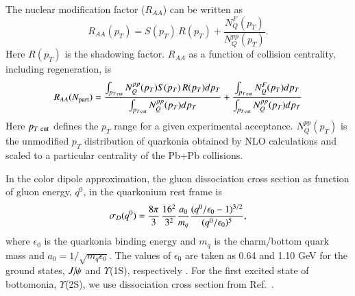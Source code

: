{\begin{equation}
  \end{equation}
  The nuclear modification factor ($R_{AA}$) can be written as 
  \begin{equation}
    R_{AA}(p_T)=S(p_T) \, R(p_T) + \frac{N_{Q}^F(p_T)}{N_{Q}^{pp}(p_T)}.
    \label{raa}
  \end{equation}
  Here $R(p_T)$ is the shadowing factor.
  $R_{AA}$ as a function of collision centrality, including regeneration, is
  \begin{equation}
    R_{AA}(N_{\rm part}) = \frac{\int_{p_{T\,\rm cut}} N_{Q}^{pp}(p_T)S(p_T)\, R(p_T) dp_T}{\int_{p_{T\,\rm cut}} N_{Q}^{pp}(p_T) dp_T} + 
    \frac{\int_{p_{T\, \rm cut}} N_{Q}^F(p_T) dp_T}{\int_{p_{T\, \rm cut}} N_{Q}^{pp}(p_T) dp_T}
    \label{raa2}
  \end{equation}
  Here $p_{T~{\rm cut}}$ defines the $p_T$ range for a given experimental acceptance.
  $N_{Q}^{pp}(p_T)$ is the unmodified $p_T$ distribution of quarkonia obtained by NLO 
  calculations and scaled to a particular centrality of the Pb+Pb collisions.
  


  In the color dipole approximation, the gluon dissociation cross section as function of gluon energy, $q^0$,
  in the quarkonium rest frame is~\cite{Bhanot:1979vb}
  \begin{equation}
    \sigma_{D}(q^{0}) = {8\pi \over 3} \, {16^2 \over 3^2} {a_0 \over m_q}  \frac{(q^0/\epsilon_0 - 1)^{3/2}} {(q^0/\epsilon_0)^5},
  \end{equation}
  where $\epsilon_0$ is the quarkonia binding energy and $m_q$ is the charm/bottom quark mass 
  and $a_0=1/\sqrt{m_q\epsilon_0}$.
  The values of $\epsilon_0$ are taken as 0.64 and 1.10 GeV for the ground states, $J\hspace{-.08em}/\hspace{-.14em}\psi$ and $\Upsilon$(1S),
  respectively \cite{Karsch:1987pv}.
  For the first excited state of bottomonia, $\Upsilon$(2S), we use dissociation
  cross section from Ref.~\cite{Arleo:2001mp}.
  
}
